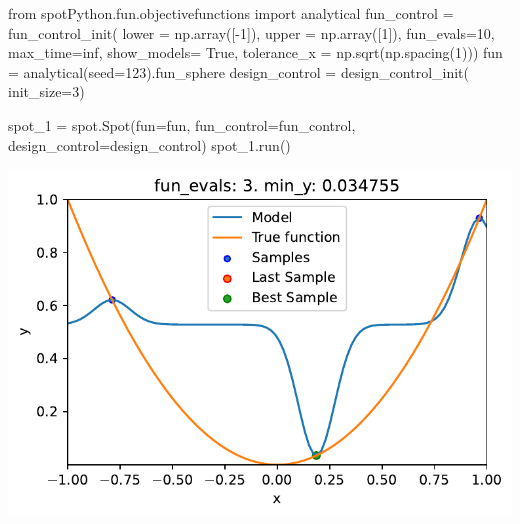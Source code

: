 \documentclass[
  letterpaper,
  DIV=11,
  numbers=noendperiod]{scrreprt}
\newenvironment{Shaded}{\begin{snugshade}}{\end{snugshade}}
\newcommand{\DecValTok}[1]{\textcolor[rgb]{0.68,0.00,0.00}{#1}}
\newcommand{\ImportTok}[1]{\textcolor[rgb]{0.00,0.46,0.62}{#1}}
\newcommand{\NormalTok}[1]{\textcolor[rgb]{0.00,0.23,0.31}{#1}}
\newcommand{\OperatorTok}[1]{\textcolor[rgb]{0.37,0.37,0.37}{#1}}
\newcommand{\VariableTok}[1]{\textcolor[rgb]{0.07,0.07,0.07}{#1}}
\begin{document}
\begin{Shaded}
\begin{Highlighting}[]
\ImportTok{from}\NormalTok{ spotPython.fun.objectivefunctions }\ImportTok{import}\NormalTok{ analytical}
\NormalTok{fun\_control }\OperatorTok{=}\NormalTok{ fun\_control\_init(}
\NormalTok{    lower }\OperatorTok{=}\NormalTok{ np.array([}\OperatorTok{{-}}\DecValTok{1}\NormalTok{]),}
\NormalTok{    upper }\OperatorTok{=}\NormalTok{ np.array([}\DecValTok{1}\NormalTok{]),}
\NormalTok{    fun\_evals}\OperatorTok{=}\DecValTok{10}\NormalTok{,}
\NormalTok{    max\_time}\OperatorTok{=}\NormalTok{inf,}
\NormalTok{    show\_models}\OperatorTok{=} \VariableTok{True}\NormalTok{,}
\NormalTok{    tolerance\_x }\OperatorTok{=}\NormalTok{ np.sqrt(np.spacing(}\DecValTok{1}\NormalTok{)))}
\NormalTok{fun }\OperatorTok{=}\NormalTok{ analytical(seed}\OperatorTok{=}\DecValTok{123}\NormalTok{).fun\_sphere}
\NormalTok{design\_control }\OperatorTok{=}\NormalTok{ design\_control\_init(}
\NormalTok{    init\_size}\OperatorTok{=}\DecValTok{3}\NormalTok{)}
\end{Highlighting}
\end{Shaded}

\begin{Shaded}
\begin{Highlighting}[]
\NormalTok{spot\_1 }\OperatorTok{=}\NormalTok{ spot.Spot(fun}\OperatorTok{=}\NormalTok{fun,}
\NormalTok{                    fun\_control}\OperatorTok{=}\NormalTok{fun\_control,}
\NormalTok{                    design\_control}\OperatorTok{=}\NormalTok{design\_control)}
\NormalTok{spot\_1.run()}
\end{Highlighting}
\end{Shaded}

\includegraphics{010_num_spot_sklearn_surrogate_files/figure-pdf/cell-39-output-1.pdf}
\end{document}
